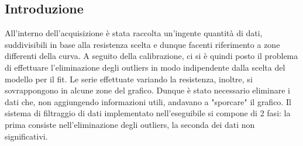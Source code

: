 \documentclass{article}[a4paper, oneside, 11pt]
\begin{document}
\subsection{Introduzione}
All'interno dell'acquisizione \`e stata raccolta un'ingente quantità di dati,
suddivisibili in base alla resistenza scelta e dunque facenti riferimento
a zone differenti della curva. A seguito della calibrazione, ci si è quindi
posto il problema di effettuare l'eliminazione degli outliers in modo
indipendente dalla scelta del modello per il fit. Le serie effettuate
variando la resistenza, inoltre, si sovrappongono in alcune zone del
grafico. Dunque è stato necessario eliminare i dati che, non aggiungendo
informazioni utili, andavano a "sporcare" il grafico. Il sistema di filtraggio
di dati implementato nell'eseguibile si compone di 2 fasi:
la prima consiste nell'eliminazione degli outliers, la seconda dei dati non
significativi.
\end{document}
